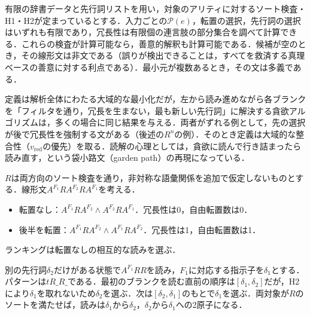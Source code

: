 \documentclass[../../main-detail.tex]{subfiles}
\begin{document}
\begin{proposition}[計算可能性]
    有限の辞書データと先行詞リストを用い，対象のアリティに対するソート検査・H1・H2が定まっているとする．入力ごとの$\mathcal P(e)$，転置の選択，先行詞の選択はいずれも有限であり，冗長性は有限個の連言肢の部分集合を調べて計算できる．これらの検査が計算可能なら，善意的解釈も計算可能である．候補が空のとき，その線形文は非文である（誤りが検出できることは，すべてを救済する真理ベースの善意に対する利点である）．最小元が複数あるとき，その文は多義である．
\end{proposition}
\begin{remark}[貪欲アルゴリズムとの関係]
    定義は解析全体にわたる大域的な最小化だが，左から読み進めながら各ブランクを「フィルタを通り，冗長を生まない，最も新しい先行詞」に解決する貪欲アルゴリズムは，多くの場合に同じ結果を与える．両者がずれる例として，先の選択が後で冗長性を強制する文がある（後述の$R^n$の例）．そのとき定義は大域的な整合性（$v_{\mathrm{red}}$の優先）を取る．読解の心理としては，貪欲に読んで行き詰まったら読み直す，という袋小路文（garden path）の再現になっている．
\end{remark}

\begin{example}[ラベルを共有する相互文]
    $R$は両方向のソート検査を通り，非対称な語彙関係を追加で仮定しないものとする．線形文$A^{F_1}RA^{F_2}RA^{F_1}$を考える．
    \begin{itemize}
        \item 転置なし：$A^{F_1}RA^{F_2}\land A^{F_2}RA^{F_1}$．冗長性は0，自由転置数は0．
        \item 後半を転置：$A^{F_1}RA^{F_2}\land A^{F_1}RA^{F_2}$．冗長性は1，自由転置数は1．
    \end{itemize}
    ランキングは転置なしの相互的な読みを選ぶ．
\end{example}

\begin{example}
    別の先行詞$\delta_2$だけがある状態で$A^{F_1}RR$を読み，$F_1$に対応する指示子を$\delta_1$とする．パターンは$tR\_R\_$である．最初のブランクを読む直前の順序は$[\delta_1,\delta_2]$だが，H2により$\delta_1$を取れないため$\delta_2$を選ぶ．次は$[\delta_2,\delta_1]$のもとで$\delta_1$を選ぶ．両対象が$R$のソートを満たせば，読みは$\delta_1$から$\delta_2$，$\delta_2$から$\delta_1$への2原子になる．
\end{example}
\end{document}
